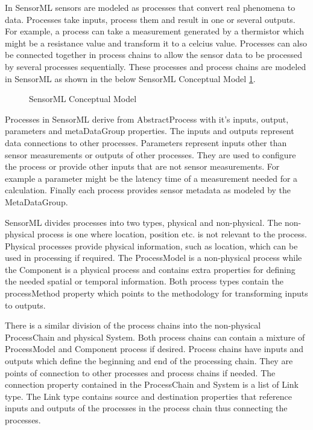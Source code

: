 \documentclass[]{final_report}
\begin{document}
In SensorML sensors are modeled as processes that convert real phenomena to data. Processes take inputs, process them and result in one or several outputs. For example, a process can take a measurement generated by a thermistor which might be a resistance value and transform it to a celcius value. Processes can also be connected together in process chains to allow the sensor data to be processed by several processes sequentially. These processes and process chains are modeled in SensorML as shown in the  below SensorML Conceptual Model \ref{fig:SMLConceptualModel}.

\begin{figure}[h]
\centering
{}
\caption{SensorML Conceptual Model}\label{fig:SMLConceptualModel}
\end{figure}

Processes in SensorML derive from AbstractProcess with it's inputs, output, parameters and metaDataGroup properties. The inputs and outputs represent data connections to other processes. Parameters represent inputs other than sensor measurements or outputs of other processes. They are used to configure the process or provide other inputs that are not sensor measurements. For example a parameter might be the latency time of a measurement needed for a calculation. Finally each process provides sensor metadata as modeled by the MetaDataGroup.

SensorML divides processes into two types, physical and non-physical. The non-physical process is one where  location, position etc. is not relevant to the process. Physical processes provide physical information, such as location, which can be used in processing if required. The ProcessModel is a non-physical process while the Component is a physical process and contains extra properties for defining the needed spatial or temporal information. Both process types contain the processMethod property which points to the methodology for transforming inputs to outputs.

There is a similar division of the process chains into the non-physical ProcessChain and physical System. Both process chains can contain a mixture of ProcessModel and Component process if desired. Process chains have inputs and outputs which define the beginning and end of the processing chain. They are points of connection to other processes and process chains if needed. The connection property contained in the ProcessChain and System is a list of Link type. The Link type contains source and destination properties that reference inputs and outputs of the processes in the process chain thus connecting the processes. 
\end{document}
